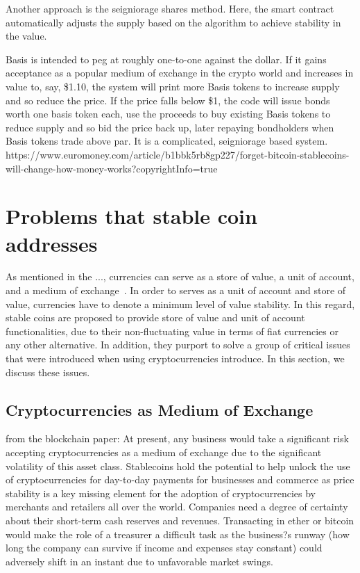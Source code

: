 Another approach is the seigniorage shares method\cite{overview}. Here, the smart contract automatically adjusts the supply based on the algorithm to achieve stability in the value.

Basis is intended to peg at roughly one-to-one against the dollar. If it gains acceptance as a popular medium of exchange in the crypto world and increases in value to, say, \$1.10, the system will print more Basis tokens to increase supply and so reduce the price.  If the price falls below \$1, the code will issue bonds worth one basis token each, use the proceeds to buy existing Basis tokens to reduce supply and so bid the price back up, later repaying bondholders when Basis tokens trade above par.  It is a complicated, seigniorage based system.
https://www.euromoney.com/article/b1bbk5rb8gp227/forget-bitcoin-stablecoins-will-change-how-money-works?copyrightInfo=true


\section{Problems that stable coin addresses}
As mentioned in the ..., currencies can serve as a store of value, a unit of account, and a medium of exchange~\cite{smithin2002money}. In order to serves as a unit of account and store of value, currencies have to denote a minimum level of value stability. In this regard, stable coins are proposed to provide store of value and unit of account functionalities, due to their non-fluctuating value in terms of fiat currencies or any other alternative. In addition, they purport to solve a group of critical issues that were introduced when using cryptocurrencies introduce. In this section, we discuss these issues.

\subsection{Cryptocurrencies as Medium of Exchange}
from the blockchain paper:
At present, any business would take a significant risk accepting cryptocurrencies as a medium of exchange
due to the significant volatility of this asset class. Stablecoins hold the potential to help unlock the use of
cryptocurrencies for day-to-day payments for businesses and commerce as price stability is a key missing
element for the adoption of cryptocurrencies by merchants and retailers all over the world.
Companies need a degree of certainty about their short-term cash reserves and revenues. Transacting
in ether or bitcoin would make the role of a treasurer a difficult task as the business?s runway (how long
the company can survive if income and expenses stay constant) could adversely shift in an instant due to
unfavorable market swings.

